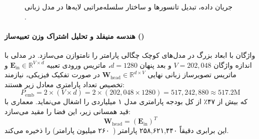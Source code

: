 \begin{figure}[htbp]
{%
}
\caption{جریان داده، تبدیل تانسورها و ساختار سلسله‌مراتبی لایه‌ها در مدل زبانی .}
\label{fig:mobilellm_pro_architecture}
\end{figure}

\paragraph*{هندسه منیفلد و تحلیل اشتراک وزن تعبیه‌ساز ()}
واژگان با ابعاد بزرگ در مدل‌های کوچک چگالی پارامتر را نامتوازن می‌سازد. در مدلی با اندازه واژگان $V = 202{,}048$ و بعد پنهان $d = 1280$، ماتریس ورودی تعبیه $\mathbf{E}_{\text{in}} \in \mathbb{R}^{V \times d}$ و ماتریس تصویرساز زبانی نهایی $\mathbf{W}_{\text{head}} \in \mathbb{R}^{d \times V}$ در صورت تفکیک فیزیکی، نیازمند تخصیص تعداد پارامتری معادل زیر هستند:
\begin{equation}
    P_{\text{emb}} = 2 \times (V \times d) = 2 \times (202{,}048 \times 1280) = 517{,}242{,}880 \approx 517.2\text{M}
\end{equation}
که بیش از ۴۷٪ از کل بودجه پارامتری مدل ۱ میلیاردی را اشغال می‌نماید. معماری  با قید همسانی زیر، این فضا را مقید می‌سازد:
\begin{equation}
    \mathbf{W}_{\text{head}} = (\mathbf{E}_{\text{in}})^T
\end{equation}
این برابری دقیقاً ۲۵۸,۶۲۱,۴۴۰ پارامتر (~۲۶۰ میلیون پارامتر) را ذخیره می‌کند.

